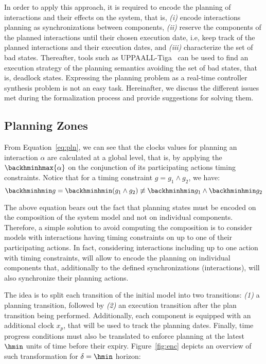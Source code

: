 In order to apply this approach, it is required to encode the planning of interactions and their effects 
on the system, that is, \emph{(i)} encode interactions planning as synchronizations between 
components, \emph{(ii)} reserve the components of the planned interactions until their chosen execution
date, i.e, keep track of the planned interactions and their execution dates,
and \emph{(iii)} characterize the set of bad states. 
Thereafter, tools such as UPPAALL-Tiga~\cite{tiga} can be used to find an execution strategy of 
the planning semantics avoiding the set of bad states, that is, deadlock states.
Expressing the planning problem as a real-time controller synthesis problem is not 
an easy task. Hereinafter, we discuss the different issues met during the formalization 
process and provide suggestions for solving them.
\subsection{Planning Zones}

From Equation~\ref{eq:pln}, we can see that the clocks values for planning an interaction $\alpha$
are calculated at a global level, that is, by applying the $\backhminhmax{\alpha}$ on the conjunction
of its participating actions timing constraints.
Notice that for a timing constraint $g=g_1\wedge g_2$, we have:
\begin{equation*}
  \backhminhmin g=\backhminhmin(g_1\wedge g_2) \not\equiv\backhminhmin g_1\wedge\backhminhmin g_2 
\end{equation*}

The above equation bears out the fact that planning states must be encoded on the composition
of the system model and not on individual components. Therefore, a simple solution to avoid 
computing the composition is to consider
models with interactions having timing constraints on up to one of their participating
actions. In fact, considering interactions including up to one action with timing constraints, will
allow to encode the planning on individual components that, additionally to the defined 
synchronizations (interactions), will also synchronize their planning actions. 

The idea is to split each transition of the initial model into two transitions:
\emph{(1)} a planning transition, followed by \emph{(2)} an execution transition
after the plan transition being performed. Additionally, each component is equipped with an additional clock $x_p$, 
that will be used to track the planning dates.
Finally, time progress conditions must also be translated to enforce planning
at the latest $\hmin$ units of time before their expiry.
Figure~\ref{fig:enc} depicts an overview of such transformation for $\delta=\hmin$ horizon: 


